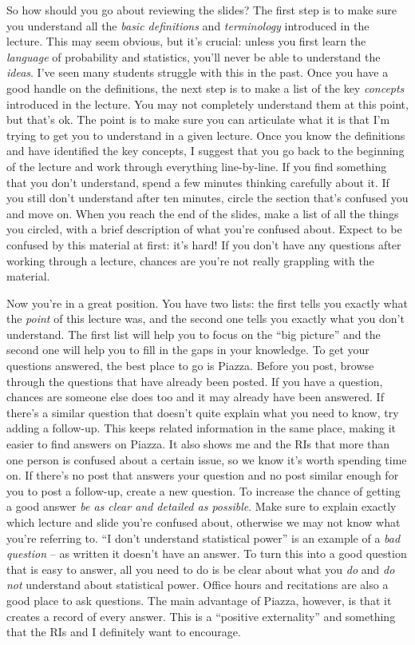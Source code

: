 \documentclass[12pt,letterpaper]{article}
\begin{document}
So how should you go about reviewing the slides?
The first step is to make sure you understand all the \emph{basic definitions} and \emph{terminology} introduced in the lecture.
This may seem obvious, but it's crucial: unless you first learn the \emph{language} of probability and statistics, you'll never be able to understand the \emph{ideas}.
I've seen many students struggle with this in the past.
Once you have a good handle on the definitions, the next step is to make a list of the key \emph{concepts} introduced in the lecture. 
You may not completely understand them at this point, but that's ok.
The point is to make sure you can articulate what it is that I'm trying to get you to understand in a given lecture.
Once you know the definitions and have identified the key concepts, I suggest that you go back to the beginning of the lecture and work through everything line-by-line.
If you find something that you don't understand, spend a few minutes thinking carefully about it.
If you still don't understand after ten minutes, circle the section that's confused you and move on.
When you reach the end of the slides, make a list of all the things you circled, with a brief description of what you're confused about.
Expect to be confused by this material at first: it's hard!
If you don't have any questions after working through a lecture, chances are you're not really grappling with the material.

Now you're in a great position.
You have two lists: the first tells you exactly what the \emph{point} of this lecture was, and the second one tells you exactly what you don't understand.
The first list will help you to focus on the ``big picture'' and the second one will help you to fill in the gaps in your knowledge.
To get your questions answered, the best place to go is Piazza.
Before you post, browse through the questions that have already been posted.
If you have a question, chances are someone else does too and it may already have been answered.
If there's a similar question that doesn't quite explain what you need to know, try adding a follow-up.
This keeps related information in the same place, making it easier to find answers on Piazza.
It also shows me and the RIs that more than one person is confused about a certain issue, so we know it's worth spending time on.
If there's no post that answers your question and no post similar enough for you to post a follow-up, create a new question.
To increase the chance of getting a good answer \emph{be as clear and detailed as possible}.
Make sure to explain exactly which lecture and slide you're confused about, otherwise we may not know what you're referring to.
``I don't understand statistical power'' is an example of a \emph{bad question} -- as written it doesn't have an answer.
To turn this into a good question that is easy to answer, all you need to do is be clear about what you \emph{do} and \emph{do not} understand about statistical power.
Office hours and recitations are also a good place to ask questions.
The main advantage of Piazza, however, is that it creates a record of every answer.
This is a ``positive externality'' and something that the RIs and I definitely want to encourage.
\end{document}

